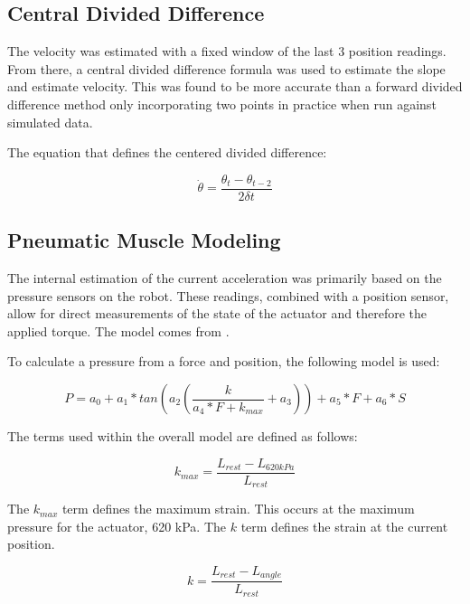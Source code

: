 \subsection{Central Divided Difference}

The velocity was estimated with a fixed window of the last 3 position readings.
From there, a central divided difference formula was used to estimate the
slope and estimate velocity. This was found to be more accurate than a forward
divided difference method only incorporating two points in practice when run
against simulated data.

The equation that defines the centered divided difference:

\begin{equation}
\dot{\theta} = \dfrac{\theta_{t} - \theta_{t - 2}}{2 \delta t}
\end{equation}

\subsection{Pneumatic Muscle Modeling}

The internal estimation of the current acceleration was primarily based on the 
pressure sensors on the robot. These readings, combined with a position sensor, 
allow for direct measurements of the state of the actuator and therefore the
applied torque. The model comes from \cite{HuntPMuscles}.

To calculate a pressure from a force and position, the following model is used:

\begin{equation}
P = a_{0} + a_{1} * tan \left(a_{2} \left(\dfrac{k}{a_{4} * F + k_{max}} + a_{3} \right) \right) + a_{5} * F + a_{6} * S
\end{equation}

The terms used within the overall model are defined as follows:

\begin{equation}
k_{max} = \dfrac{L_{rest} - L_{620 kPa}}{L_{rest}}
\end{equation}

The $k_{max}$ term defines the maximum strain. This occurs at the maximum pressure for the actuator, 620 kPa. The $k$ term defines the strain at the current position.

\begin{equation}
k = \dfrac{L_{rest} - L_{angle}}{L_{rest}}
\end{equation}


